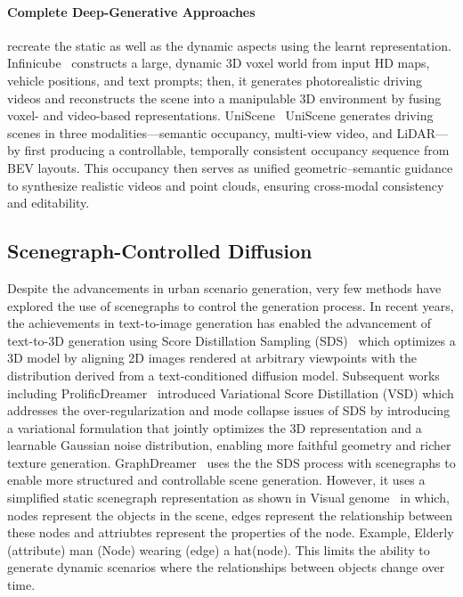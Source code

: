 \documentclass{article}
\begin{document}
\paragraph{Complete Deep-Generative Approaches} recreate the static as well as the dynamic aspects using the learnt representation. Infinicube~\cite{lu2024infinicube} constructs a large, dynamic 3D voxel world from input HD maps, vehicle positions, and text prompts; then, it generates photorealistic driving videos and reconstructs the scene into a manipulable 3D environment by fusing voxel- and video-based representations. UniScene~\cite{li2025uniscene} UniScene generates driving scenes in three modalities—semantic occupancy, multi-view video, and LiDAR—by first producing a controllable, temporally consistent occupancy sequence from BEV layouts. This occupancy then serves as unified geometric–semantic guidance to synthesize realistic videos and point clouds, ensuring cross-modal consistency and editability.


\subsection{Scenegraph-Controlled Diffusion}

Despite the advancements in urban scenario generation, very few methods have explored the use of scenegraphs to control the generation process. In recent years, the achievements in text-to-image generation has enabled the advancement of text-to-3D generation using Score Distillation Sampling (SDS)~\cite{poole2022dreamfusion} which optimizes a 3D model by aligning 2D images rendered at arbitrary viewpoints with the distribution derived from a text-conditioned diffusion model. Subsequent works including ProlificDreamer~\cite{wang2023prolificdreamer} introduced Variational Score Distillation (VSD) which addresses the over-regularization and mode collapse issues of SDS by introducing a variational formulation that jointly optimizes the 3D representation and a learnable Gaussian noise distribution, enabling more faithful geometry and richer texture generation. GraphDreamer~\cite{gao2024graphdreamer}  uses the the SDS process with scenegraphs to enable more structured and controllable scene generation. However, it uses a simplified static scenegraph representation as shown in Visual genome~\cite{krishna2017visual} in which, nodes represent the objects in the scene, edges represent the relationship between these nodes and attriubtes represent the properties of the node. Example, Elderly (attribute) man (Node) wearing (edge) a hat(node). This limits the ability to generate dynamic scenarios where the relationships between objects change over time.
\end{document}

